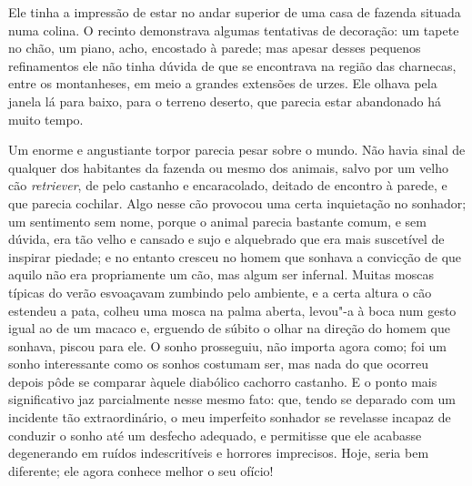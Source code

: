 Ele tinha a impressão de estar no andar superior de uma casa de fazenda
situada numa colina.  O recinto demonstrava algumas tentativas de
decoração: um tapete no chão, um piano, acho, encostado à parede; mas
apesar desses pequenos refinamentos ele não tinha dúvida de que se
encontrava na região das charnecas, entre os montanheses, em meio a
grandes extensões de urzes.  Ele olhava pela janela lá para baixo, para
o terreno deserto, que parecia estar abandonado há muito tempo.

Um enorme e angustiante torpor parecia pesar sobre o mundo.  Não havia
sinal de qualquer dos habitantes da fazenda ou mesmo dos animais, salvo
por um velho cão \textit{retriever}, de pelo castanho e encaracolado,
deitado de encontro à parede, e que parecia cochilar.  Algo nesse cão
provocou uma certa inquietação no sonhador; um sentimento sem nome,
porque o animal parecia bastante comum, e sem dúvida, era tão velho e
cansado e sujo e alquebrado que era mais suscetível de inspirar
piedade; e no entanto cresceu no homem que sonhava a convicção de que
aquilo não era propriamente um cão, mas algum ser infernal.  Muitas
moscas típicas do verão esvoaçavam zumbindo pelo ambiente, e a certa
altura o cão estendeu a pata, colheu uma mosca na palma aberta, levou"-a
à boca num gesto igual ao de um macaco e, erguendo de súbito o olhar na
direção do homem que sonhava, piscou para ele.  O sonho
prosseguiu, não importa agora como; foi um sonho interessante como os
sonhos costumam ser, mas nada do que ocorreu depois pôde se comparar
àquele diabólico cachorro castanho.  E o ponto mais significativo jaz
parcialmente nesse mesmo fato: que, tendo se deparado com um incidente
tão extraordinário, o meu imperfeito sonhador se revelasse incapaz de
conduzir o sonho até um desfecho adequado, e permitisse que ele
acabasse degenerando em ruídos indescritíveis e horrores imprecisos. 
Hoje, seria bem diferente; ele agora conhece melhor o seu ofício!

